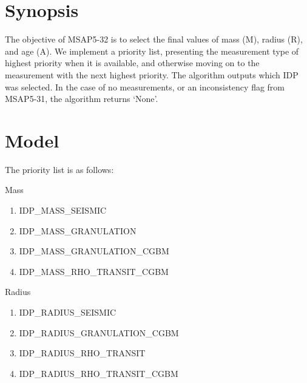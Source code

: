 \documentclass[a4paper, oneside, 11pt, article, english]{memoir}
\begin{document}



\section{Synopsis}
\label{sec:synopsis}

The objective of MSAP5-32 is to select the final values of mass (M), radius (R), and age (A). We implement a priority list, presenting the measurement type of highest priority when it is available, and otherwise moving on to the measurement with the next highest priority. The algorithm outputs which IDP was selected. In the case of no measurements, or an inconsistency flag from MSAP5-31, the algorithm returns `None'. 





\section{Model}
\label{sec:model}

The priority list is as follows:

Mass
\begin{enumerate}
    \item IDP\_MASS\_SEISMIC
    \item IDP\_MASS\_GRANULATION
    \item IDP\_MASS\_GRANULATION\_CGBM
    \item IDP\_MASS\_RHO\_TRANSIT\_CGBM
\end{enumerate}

Radius
\begin{enumerate}
    \item IDP\_RADIUS\_SEISMIC
    \item IDP\_RADIUS\_GRANULATION\_CGBM
    \item IDP\_RADIUS\_RHO\_TRANSIT
    \item IDP\_RADIUS\_RHO\_TRANSIT\_CGBM
\end{enumerate}
\end{document}
